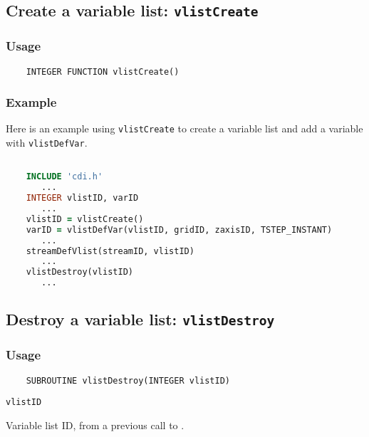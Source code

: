

\subsection{Create a variable list: {\tt vlistCreate}}
\label{vlistCreate}
\subsubsection*{Usage}

\begin{verbatim}
    INTEGER FUNCTION vlistCreate()
\end{verbatim}

\subsubsection*{Example}

Here is an example using {\tt vlistCreate} to create a variable list
and add a variable with {\tt vlistDefVar}.

\begin{lstlisting}[language=Fortran, backgroundcolor=\color{pyellow}, basicstyle=\small, columns=flexible]

    INCLUDE 'cdi.h'
       ...
    INTEGER vlistID, varID
       ...
    vlistID = vlistCreate()
    varID = vlistDefVar(vlistID, gridID, zaxisID, TSTEP_INSTANT)
       ...
    streamDefVlist(streamID, vlistID)
       ...
    vlistDestroy(vlistID)
       ...
\end{lstlisting}


\subsection{Destroy a variable list: {\tt vlistDestroy}}
\label{vlistDestroy}
\subsubsection*{Usage}

\begin{verbatim}
    SUBROUTINE vlistDestroy(INTEGER vlistID)
\end{verbatim}

\hspace*{4mm}\begin{minipage}[]{15cm}
\begin{deflist}{\tt vlistID\ }
\item[{\tt vlistID}]
Variable list ID, from a previous call to {}.

\end{deflist}
\end{minipage}


